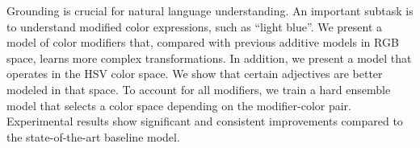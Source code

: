 Grounding is crucial for natural language understanding. An important subtask is to understand modified color expressions, such as ``light blue''. We present a model of color modifiers that, compared with previous additive models in RGB space, learns more complex transformations. In addition, we present a model that operates in the HSV color space. We show that certain adjectives are better modeled in that space. To account for all modifiers, we train a hard ensemble model that selects a color space depending on the modifier-color pair. Experimental results show significant and consistent improvements compared to the state-of-the-art baseline model.